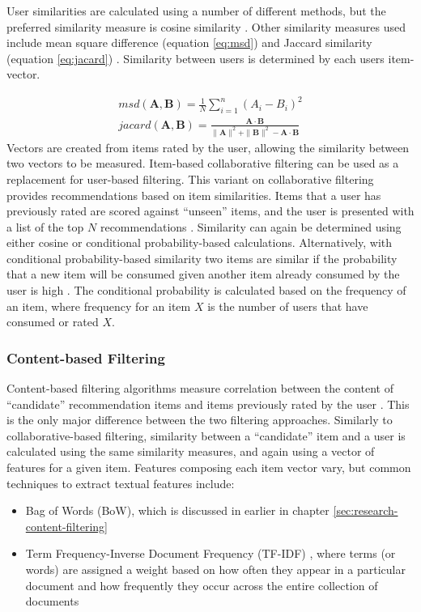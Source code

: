 User similarities are calculated using a number of different methods, but the preferred similarity measure is cosine similarity \cite{linden2003amazon, sarwar2001item, liu2014new}. Other similarity measures used include mean square difference (equation \ref{eq:msd}) and Jaccard similarity (equation \ref{eq:jacard}) \cite{liu2014new}. Similarity between users is determined by each users item-vector.

\begin{align}
msd(\mathbf{A}, \mathbf{B}) = \frac{1}{N}\sum\limits_{i=1}^{n}(A_i - B_i)^2 \label{eq:msd} \\
jacard(\mathbf{A}, \mathbf{B}) = \frac{\mathbf{A} \cdot \mathbf{B}}{\|\mathbf{A}\|^2 + \|\mathbf{B}\|^2 -  \mathbf{A} \cdot \mathbf{B}} \label{eq:jacard}
\end{align}
Vectors are created from items rated by the user, allowing the similarity between two vectors to be measured. Item-based collaborative filtering can be used as a replacement for user-based filtering. This variant on collaborative filtering provides recommendations based on item similarities. Items that a user has previously rated are scored against ``unseen'' items, and the user is presented with a list of the top $N$ recommendations \cite{sarwar2001item}. Similarity can  again be determined using either cosine or conditional probability-based calculations. Alternatively, with conditional probability-based similarity two items are similar if the probability that a new item will be consumed given another item already consumed by the user is high \cite{sarwar2001item}. The conditional probability is calculated based on the frequency of an item, where frequency for an item $X$ is the number of users that have consumed or rated $X$. 

\subsubsection{Content-based Filtering} 
Content-based filtering algorithms measure correlation between the content of ``candidate'' recommendation items and items previously rated by the user \cite{van2000using}. This is the only major difference between the two filtering approaches. Similarly to collaborative-based filtering, similarity between a ``candidate'' item and a user is calculated using the same similarity measures, and again using a vector of features for a given item. Features composing each item vector vary, but common techniques to extract textual features include:
\begin{itemize}
\item Bag of Words (BoW), which is discussed in earlier in chapter \ref{sec:research-content-filtering}
\item Term Frequency-Inverse Document Frequency (TF-IDF) \cite{van2000using}, where terms (or words) are assigned a weight based on how often they appear in a particular document and how frequently they occur across the entire collection of documents \cite{scikit:tfidf}
\end{itemize} 

